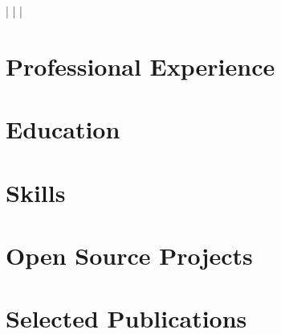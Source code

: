 \documentclass[a4paper,11pt]{article}
\begin{document}
    \begin{center}
        \myName
        \myAddress
        \myWebsite | \myMailAddress | \myGithub | \myPhoneNumber
    \end{center}

    \section{Professional Experience}
        \begin{itemize}
            \postdocDense
                \cvItemizeBegin
                    \postdocOne
                    \postdocTwo
                \cvItemizeEnd
            \expFlowersDense
                \cvItemizeBegin
                    \expFlowersOne
                    \expFlowersTwo
                \cvItemizeEnd
            \expInfineonDense
                \cvItemizeBegin
                    \expInfineonOne
                    \expInfineonTwo
                \cvItemizeEnd
            \expSliveDense
                \cvItemizeBegin
                    \expSliveOne
                    \expSliveTwo
                \cvItemizeEnd
        \end{itemize}

    \section{Education}
        \begin{itemize}
            \summerSchoolDense
            \phdDense
            \mscDense
            \bscDense
        \end{itemize}

    \section{Skills}
        \begin{itemize}
            \skillsProgramming
            \skillsLanguages
        \end{itemize}

    \section{Open Source Projects}
        \begin{itemize}
            \fossHPZ
                \cvItemizeBegin
                    \fossHPZOne
                    \fossHPZTwo
                    \fossHPZThree
                \cvItemizeEnd
            \fossConvSnn
                \cvItemizeBegin
                    \fossConvSnnOne
                    \fossConvSnnTwo
                \cvItemizeEnd
        \end{itemize}

    \section{Selected Publications}
        \publicationItemizeBegin
            \publicationInCIT
            \publicationAAAI
            \publicationSpikingTransformer
            \seeGoogleScholar
        \publicationItemizeEnd
\end{document}
